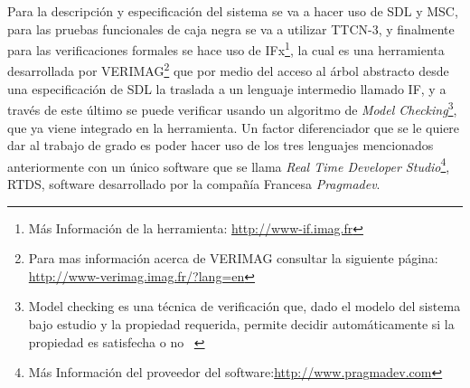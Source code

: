 Para la descripci\'on y especificaci\'on del sistema se va a hacer uso de SDL y 
MSC, para las pruebas funcionales de caja negra se va a utilizar TTCN-3, y 
finalmente para las verificaciones formales se hace uso de IFx\footnote{M\'as 
Informaci\'on de la herramienta: \url{http://www-if.imag.fr}}, la cual es una 
herramienta desarrollada por VERIMAG\footnote{Para mas informaci\'on acerca de VERIMAG consultar la siguiente p\'agina: \url{http://www-verimag.imag.fr/?lang=en}} que por medio del acceso al \'arbol 
abstracto desde una especificaci\'on de SDL la traslada a un lenguaje intermedio 
llamado IF,  y a trav\'es de este \'ultimo se puede verificar usando un 
algoritmo de \textit{Model Checking}\footnote{Model checking es una t\'ecnica 
de verificaci\'on que, dado el modelo del sistema bajo estudio y la propiedad 
requerida, permite decidir autom\'aticamente si la propiedad es satisfecha o no 
~\cite{Clarke1996,Hames2009}}, que ya viene 
integrado en la herramienta. Un factor diferenciador que se le quiere dar al 
trabajo de grado es poder hacer uso de los tres lenguajes mencionados 
anteriormente con un \'unico software que se llama \textit{Real Time Developer 
Studio}\footnote{M\'as Informaci\'on del proveedor del 
software:\url{http://www.pragmadev.com}}, RTDS, software desarrollado por la 
compa\~n\'ia Francesa \textit{Pragmadev}.

